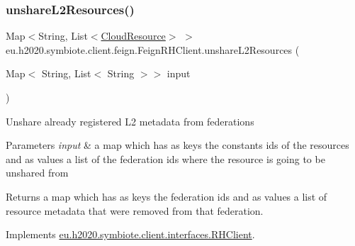 \mbox{\label{classeu_1_1h2020_1_1symbiote_1_1client_1_1feign_1_1FeignRHClient_aaac584d86c2d5c63dbfe1a367fc3bd24}} 
\subsubsection{\texorpdfstring{unshare\+L2\+Resources()}{unshareL2Resources()}}
{\footnotesize\ttfamily Map$<$String, List$<$\hyperlink{classeu_1_1h2020_1_1symbiote_1_1cloud_1_1model_1_1internal_1_1CloudResource}{Cloud\+Resource}$>$ $>$ eu.\+h2020.\+symbiote.\+client.\+feign.\+Feign\+R\+H\+Client.\+unshare\+L2\+Resources (\begin{DoxyParamCaption}\item[{Map$<$ String, List$<$ String $>$$>$}]{input }\end{DoxyParamCaption})}

Unshare already registered L2 metadata from federations 
\begin{DoxyParams}{Parameters}
{\em input} & a map which has as keys the constants ids of the resources and as values a list of the federation ids where the resource is going to be unshared from \\
\hline
\end{DoxyParams}
\begin{DoxyReturn}{Returns}
a map which has as keys the federation ids and as values a list of resource metadata that were removed from that federation. 
\end{DoxyReturn}


Implements \hyperlink{interfaceeu_1_1h2020_1_1symbiote_1_1client_1_1interfaces_1_1RHClient_a0570ca0fb6285f0e9900429c93a83de3}{eu.\+h2020.\+symbiote.\+client.\+interfaces.\+R\+H\+Client}.

\mbox{\label{classeu_1_1h2020_1_1symbiote_1_1client_1_1feign_1_1FeignRHClient_a447837da729d2022e118cb22887d993d}} 
